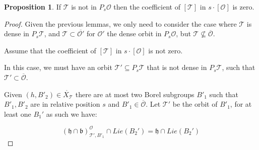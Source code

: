 \documentclass[12pt]{article}
\theoremstyle{plain}
\theoremstyle{definition}
\newtheorem{prop}[theorem]{Proposition}
\begin{document}
\begin{prop}\label{prop:support}
    If $\mathcal{T}$ is not in $P_{s}\mathcal{O}$ then the coefficient of $[\mathcal{T}]$ in ${s}\cdot [\mathcal{O}]$ is zero. 
\end{prop}
\begin{proof}
    Given the previous lemmas, we only need to consider the case where $\mathcal{T}$ is dense in $P_{s}\mathcal{T}$, and $\mathcal{T} \subset\overline{\mathcal{O}'}$ for $\mathcal{O}'$ the dense orbit in $P_{s}\mathcal{O}$, but $\mathcal{T}\nsubseteq \overline{\mathcal{O}}$.

    Assume that the coefficient of $[\mathcal{T}]$ in ${s}\cdot [\mathcal{O}]$ is not zero. 

    In this case, we must have an orbit $\mathcal{T}'\subseteq P_{s}\mathcal{T}$ that is not dense in $P_s\mathcal{T}$, such that $\mathcal{T}'\subset \overline{\mathcal{O}}$.

    Given $(h,B'_{2})\in \mathring{X_{\mathcal{T}}}$ there are at most two Borel subgroups $B'_{1}$ such that $B'_{1},B'_{2}$ are in relative position $s$ and $B'_{1}\in \overline{\mathcal{O}}$. Let $\mathcal{T}'$ be the orbit of $B'_{1}$, for at least one $B_1'$ as such we have:

    $$(\mathfrak{h}\cap \mathfrak{b})^{\mathcal{O}}_{ \mathcal{T'},B'_1}\cap Lie(B_2')=\mathfrak{h}\cap Lie(B_2')$$




    



\end{proof}
\end{document}
